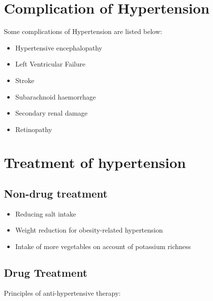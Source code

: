 \documentclass[
  letterpaper,
  DIV=11,
  numbers=noendperiod]{scrreprt}
\providecommand{\tightlist}{%
  \setlength{\itemsep}{0pt}\setlength{\parskip}{0pt}}\usepackage{longtable,booktabs,array}
\begin{document}
\hypertarget{complication-of-hypertension}{%
\section{Complication of
Hypertension}\label{complication-of-hypertension}}

Some complications of Hypertension are listed below:

\begin{itemize}
\tightlist
\item
  Hypertensive encephalopathy
\item
  Left Ventricular Failure
\item
  Stroke
\item
  Subarachnoid haemorrhage
\item
  Secondary renal damage
\item
  Retinopathy
\end{itemize}

\hypertarget{treatment-of-hypertension}{%
\section{Treatment of hypertension}\label{treatment-of-hypertension}}

\hypertarget{non-drug-treatment}{%
\subsection{Non-drug treatment}\label{non-drug-treatment}}

\begin{itemize}
\tightlist
\item
  Reducing salt intake
\item
  Weight reduction for obesity-related hypertension
\item
  Intake of more vegetables on account of potassium richness
\end{itemize}

\hypertarget{drug-treatment}{%
\subsection{Drug Treatment}\label{drug-treatment}}

Principles of anti-hypertensive therapy:
\end{document}
